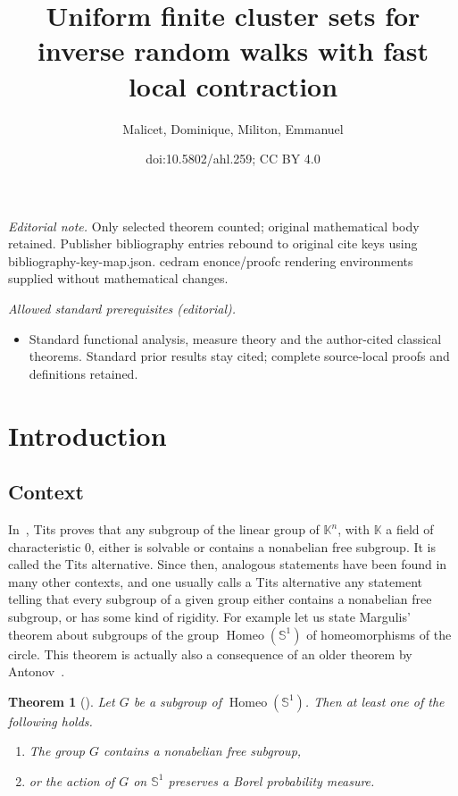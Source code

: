 \documentclass[10pt]{amsart}
\title{Uniform finite cluster sets for inverse random walks with fast local contraction}
\author{Malicet, Dominique, Militon, Emmanuel}
\date{doi:10.5802/ahl.259; CC BY 4.0}
\newtheorem{theo}{Theorem}[section]
\theoremstyle{definition}\newtheorem{defi}[theo]{Definition}\newtheorem{rema}[theo]{Remark}\newtheorem{exam}[theo]{Example}\newtheorem{exem}[theo]{Example}\newtheorem{nota}[theo]{Notation}
\DeclareMathOperator{\Homeo}{Homeo}
\newcommand{\bbK}{\mathbb{K}}
\newcommand{\bbS}{\mathbb{S}}
\begin{document}
\maketitle
\noindent\textit{Editorial note.} Only selected theorem counted; original mathematical body retained. Publisher bibliography entries rebound to original cite keys using bibliography-key-map.json. cedram enonce/proofc rendering environments supplied without mathematical changes.\par\medskip
\noindent\textit{Allowed standard prerequisites (editorial).}\begin{itemize}
\item Standard functional analysis, measure theory and the author-cited classical theorems. Standard prior results stay cited; complete source-local proofs and definitions retained.
\end{itemize}\medskip






\section{Introduction}

\subsection{Context}

In~\cite{Tits}, Tits proves that any subgroup of the linear group of $\bbK^n$, with $\bbK$ a field of characteristic $0$, either is solvable or contains a nonabelian free subgroup. It is called the Tits alternative. Since then, analogous statements have been found in many other contexts, and one usually calls a Tits alternative any statement telling that every subgroup of a given group either contains a nonabelian free subgroup, or has some kind of rigidity. For example let us state Margulis' theorem about subgroups of the group $\Homeo(\bbS^1)$ of homeomorphisms of the circle. This theorem is actually also a consequence of an older theorem by Antonov~\cite{Ant}.

\begin{theo}[{\cite{Mar}}]
\label{Margulis}
Let $G$ be a subgroup of $\Homeo(\bbS^1)$. Then at least one of the following holds.
\begin{enumerate}
\item\label{theo1.1.1} The group $G$ contains a nonabelian free subgroup,
\item\label{theo1.1.2} or the action of $G$ on $\bbS^1$ preserves a Borel probability measure.
\end{enumerate}
\end{theo}
\end{document}
